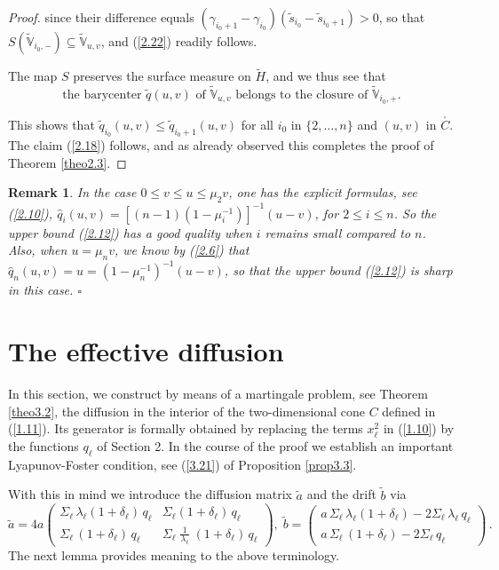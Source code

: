 \documentclass[12pt,leqno]{article}
\def\IV{{\mathbb V}}
\def\n{\noindent}
\def\wh{\widehat}
\def\wt{\widetilde}
\newtheorem{remark}[theorem]{Remark}
\begin{document}
\begin{proof}
\n
since  their difference equals $(\gamma_{i_0 + 1} - \gamma_{i_0}) (\wt{s}_{i_0} - \wt{s}_{i_0 + 1}) > 0$, so that $S(\wt{\IV}_{i_0, -}) \subseteq \wt{\IV}_{u,v}$, and (\ref{2.22}) readily follows.

\medskip
The map $S$ preserves the surface measure on $\wt{H}$, and we thus see that
\begin{equation}\label{2.24}
\mbox{the barycenter $\wt{q}(u,v)$ of $\wt{\IV}_{u,v}$ belongs to the closure of $\wt{\IV}_{i_0, +}$}.
\end{equation}

\n
This shows that $\wt{q}_{i_0}(u,v) \le \wt{q}_{i_0 + 1}(u,v)$ for all $i_0$ in $\{2,\dots,n\}$ and $(u,v)$ in $\stackrel{_\circ}{C}$. The claim (\ref{2.18}) follows, and as already observed this completes the proof of Theorem \ref{theo2.3}.
\end{proof}

\begin{remark}\label{rem2.4} \rm In the case $0 \le v \le u \le \mu_2 v$, one has the explicit formulas, see (\ref{2.10}), $\wh{q}_i (u,v) = [(n-1) (1 - \mu_i^{-1})]^{-1} (u-v)$, for $2 \le i \le n$. So the upper bound (\ref{2.12}) has a good quality when $i$ remains small compared to $n$. Also, when $u = \mu_n v$, we know by (\ref{2.6}) that $\wh{q}_n (u,v) = u = (1-\mu_n^{-1})^{-1} (u-v)$, so that the upper bound (\ref{2.12}) is sharp in this case. \hfill $\square$

\end{remark}

\section{The effective diffusion}
\setcounter{equation}{0}

In this section, we construct by means of a martingale problem, see Theorem \ref{theo3.2}, the diffusion in the interior of the two-dimensional cone $C$ defined in (\ref{1.11}).  Its generator is formally obtained by replacing the terms $x^2_\ell$ in (\ref{1.10}) by the functions $q_\ell$ of Section 2. In the course of the proof we establish an important Lyapunov-Foster condition, see (\ref{3.21}) of Proposition \ref{prop3.3}.

\medskip
With this in mind we introduce the diffusion matrix $\wt{a}$ and the drift $\wt{b}$ via
\begin{equation}\label{3.1}
\wt{a} = 4a \left(\begin{array}{ll}
\Sigma_\ell \, \lambda_\ell (1 + \delta_\ell)\,q_\ell & \Sigma_\ell (1 + \delta_\ell)\,q_\ell
\\[1ex]
\Sigma_\ell \, (1 + \delta_\ell)\,q_\ell & \Sigma_\ell \; \frac{1}{\lambda_\ell} \; (1 + \delta_\ell)\,q_\ell
\end{array}\right), \; \wt{b}  =  \left(\begin{array}{ll}
a\, \Sigma_\ell \, \lambda_\ell (1 + \delta_\ell) - 2 \Sigma_\ell \,\lambda_\ell \,q_\ell\\[1ex]
a\, \Sigma_\ell \, (1 + \delta_\ell) - 2 \Sigma_\ell \,q_\ell
\end{array}\right)\,.
\end{equation}
The next lemma provides meaning to the above terminology.
\end{document}
